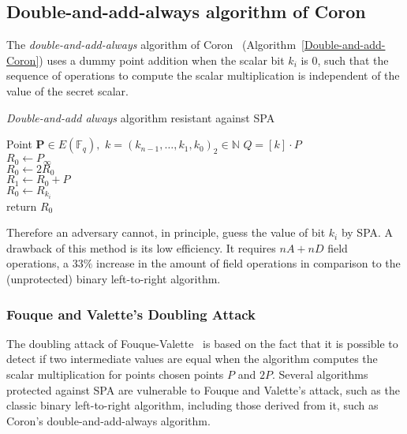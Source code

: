 
\subsection{Double-and-add-always algorithm of Coron~\cite{Coron1999}}

The {\it double-and-add-always} algorithm of Coron~\cite{Coron1999} (Algorithm~\ref{Double-and-add-Coron}) uses a dummy point addition when the scalar bit $k_i$ is $0$, such that the sequence of operations to compute the scalar multiplication is independent of the value of the secret scalar.

\begin{algorithm}[h] %
	\caption{\small{\textit{Double-and-add always} algorithm resistant against SPA}}
	\label{Double-and-add-Coron}
	\begin{algorithmic}[1]
		\REQUIRE  Point $\textbf{P} \in E(\mathbb{F}_q),$ $k=(k_{n-1},\ldots,k_1,k_0)_2 \in \mathbb{N}$
		\ENSURE  $Q=[k] \cdot P$\\
		\STATE $R_0\leftarrow P_{\infty}$   \\
		\STATE $R_0\leftarrow 2R_0$  \\
		\STATE $R_1\leftarrow R_0+P$\\ \label{Paso_R_1_Double-and-add-Coron}
		\STATE $R_0\leftarrow R_{k_i}$\label{Step5Double-and-add-Coron} \\
		\ENDFOR
		\STATE return $R_0$\\
	\end{algorithmic}
\end{algorithm}

Therefore an adversary cannot, in principle, guess the value of bit $k_i$ by SPA. A drawback of this method is its low efficiency. It requires $nA+nD$ field operations, a $33\%$ increase in the amount of field operations in comparison to the (unprotected) binary left-to-right algorithm.

\subsubsection{Fouque and Valette's Doubling Attack \cite{CHES:FouVal03}}\label{Fouque-Valette-DoublingAttack}
The doubling attack of Fouque-Valette~\cite{CHES:FouVal03} is based on the fact that it is possible to detect if two intermediate values are equal when the algorithm computes the scalar multiplication for points chosen points $P$ and $2P.$ Several algorithms protected against SPA are vulnerable to Fouque and Valette's attack, such as the classic binary left-to-right algorithm, including those derived from it, such as Coron's double-and-add-always algorithm.

